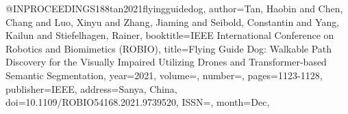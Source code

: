 @INPROCEEDINGS{188tan2021flyingguidedog,
author={Tan, Haobin and Chen, Chang and Luo, Xinyu and Zhang, Jiaming and Seibold, Constantin and Yang, Kailun and Stiefelhagen, Rainer},
booktitle={IEEE International Conference on Robotics and Biomimetics (ROBIO)}, 
title={Flying Guide Dog: Walkable Path Discovery for the Visually Impaired Utilizing Drones and Transformer-based Semantic Segmentation}, 
year={2021},
volume={},
number={},
pages={1123-1128},
publisher={IEEE},
address={Sanya, China},
doi={10.1109/ROBIO54168.2021.9739520},
ISSN={},
month={Dec},}